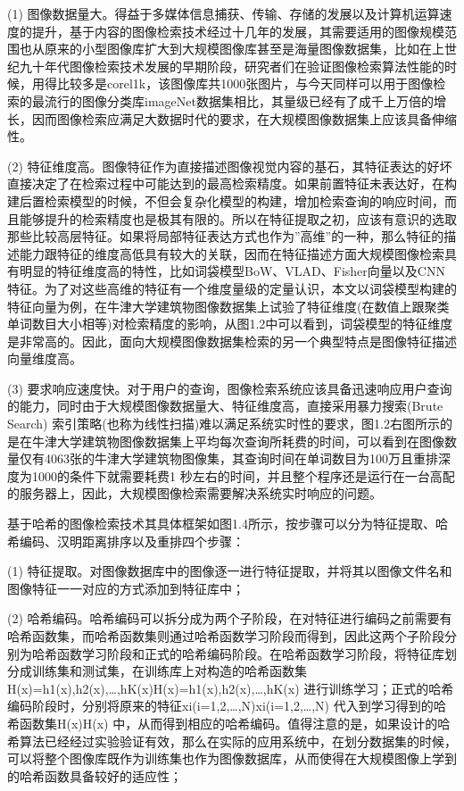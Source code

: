 \documentclass[color=cyan,mathpazo,titlestyle=hang]{elegantbook}
\begin{document}
(1) 图像数据量大。得益于多媒体信息捕获、传输、存储的发展以及计算机运算速度的提升，基于内容的图像检索技术经过十几年的发展，其需要适用的图像规模范围也从原来的小型图像库扩大到大规模图像库甚至是海量图像数据集，比如在上世纪九十年代图像检索技术发展的早期阶段，研究者们在验证图像检索算法性能的时候，用得比较多是corel1k，该图像库共1000张图片，与今天同样可以用于图像检索的最流行的图像分类库imageNet数据集相比，其量级已经有了成千上万倍的增长，因而图像检索应满足大数据时代的要求，在大规模图像数据集上应该具备伸缩性。

(2) 特征维度高。图像特征作为直接描述图像视觉内容的基石，其特征表达的好坏直接决定了在检索过程中可能达到的最高检索精度。如果前置特征未表达好，在构建后置检索模型的时候，不但会复杂化模型的构建，增加检索查询的响应时间，而且能够提升的检索精度也是极其有限的。所以在特征提取之初，应该有意识的选取那些比较高层特征。如果将局部特征表达方式也作为”高维”的一种，那么特征的描述能力跟特征的维度高低具有较大的关联，因而在特征描述方面大规模图像检索具有明显的特征维度高的特性，比如词袋模型BoW、VLAD、Fisher向量以及CNN特征。为了对这些高维的特征有一个维度量级的定量认识，本文以词袋模型构建的特征向量为例，在牛津大学建筑物图像数据集上试验了特征维度(在数值上跟聚类单词数目大小相等)对检索精度的影响，从图1.2中可以看到，词袋模型的特征维度是非常高的。因此，面向大规模图像数据集检索的另一个典型特点是图像特征描述向量维度高。

(3) 要求响应速度快。对于用户的查询，图像检索系统应该具备迅速响应用户查询的能力，同时由于大规模图像数据量大、特征维度高，直接采用暴力搜索(Brute Search) 索引策略(也称为线性扫描)难以满足系统实时性的要求，图1.2右图所示的是在牛津大学建筑物图像数据集上平均每次查询所耗费的时间，可以看到在图像数量仅有4063张的牛津大学建筑物图像集，其查询时间在单词数目为100万且重排深度为1000的条件下就需要耗费1 秒左右的时间，并且整个程序还是运行在一台高配的服务器上，因此，大规模图像检索需要解决系统实时响应的问题。

基于哈希的图像检索技术其具体框架如图1.4所示，按步骤可以分为特征提取、哈希编码、汉明距离排序以及重排四个步骤：

(1) 特征提取。对图像数据库中的图像逐一进行特征提取，并将其以图像文件名和图像特征一一对应的方式添加到特征库中；

(2) 哈希编码。哈希编码可以拆分成为两个子阶段，在对特征进行编码之前需要有哈希函数集，而哈希函数集则通过哈希函数学习阶段而得到，因此这两个子阶段分别为哈希函数学习阶段和正式的哈希编码阶段。在哈希函数学习阶段，将特征库划分成训练集和测试集，在训练库上对构造的哈希函数集H(x)=h1(x),h2(x),…,hK(x)H(x)=h1(x),h2(x),…,hK(x) 进行训练学习；正式的哈希编码阶段时，分别将原来的特征xi(i=1,2,…,N)xi(i=1,2,…,N) 代入到学习得到的哈希函数集H(x)H(x) 中，从而得到相应的哈希编码。值得注意的是，如果设计的哈希算法已经经过实验验证有效，那么在实际的应用系统中，在划分数据集的时候，可以将整个图像库既作为训练集也作为图像数据库，从而使得在大规模图像上学到的哈希函数具备较好的适应性；
\end{document}

